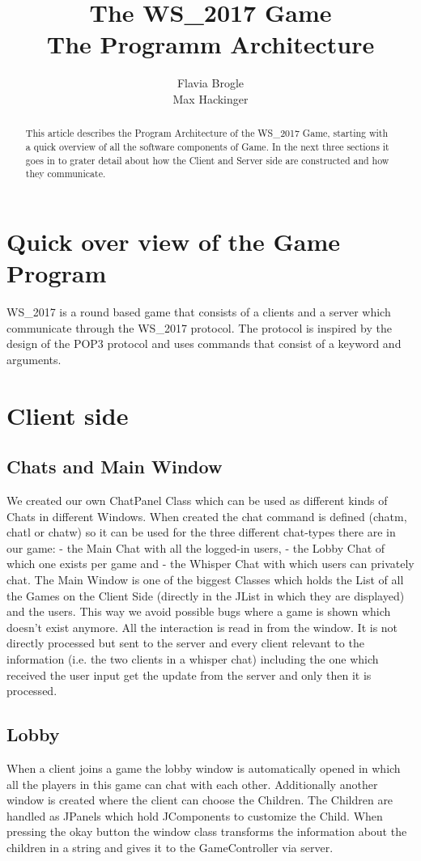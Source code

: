 \documentclass[11pt,a4paper]{article}
\title{The WS\_2017 Game \\ The Programm Architecture}
\author{Flavia Brogle \\ Max Hackinger}
\begin{document}
	\maketitle
  \tableofcontents
  
\begin{abstract}
  This article describes the Program Architecture of the WS\_2017 Game, starting with a quick overview of all the  software components of Game. In the next three sections it goes in to grater detail about how the Client and Server side are constructed and how they communicate.
\end{abstract}  
  \clearpage
	\section{Quick over view of the Game Program}
	  WS\_2017 is a round based game that consists of a clients and a server which communicate through the WS\_2017 protocol. The protocol is inspired by the design of the POP3 protocol and uses commands that consist of a keyword and arguments.

	\section{Client side}
		\subsection{Chats and Main Window}
We created our own ChatPanel Class which can be used as different kinds of Chats in different Windows. When created the chat command is defined (chatm, chatl or chatw) so it can be used for the three different chat-types there are in our game:
- the Main Chat with all the logged-in users,
- the Lobby Chat of which one exists per game and
- the Whisper Chat with which users can privately chat.
The Main Window is one of the biggest Classes which holds the List of all the Games on the Client Side (directly in the JList in which they are displayed) and the users. This way we avoid possible bugs where a game is shown which doesn't exist anymore.
All the interaction is read in from the window. It is not directly processed but sent to the server and every client relevant to the information (i.e. the two clients in a whisper chat) including the one which received the user input get the update from the server and only then it is processed.
		\subsection{Lobby}
		When a client joins a game the lobby window is automatically opened in which all the players in this game can chat with each other. Additionally another window is created where the client can choose the Children. The Children are handled as JPanels which hold JComponents to customize the Child. When pressing the okay button the window class transforms the information about the children in a string and gives it to the GameController via server.
\end{document}
